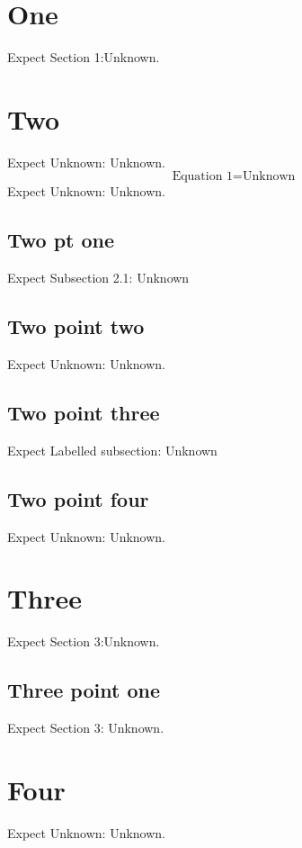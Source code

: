 \documentclass{article}
\def\where{Unknown}
\begin{document}
\section{One}
Expect Section 1:\where.

\section{Two}
Expect Unknown: \where.
\begin{equation}
  \mbox{Equation 1} = \mbox{\where}
\end{equation}
Expect Unknown: \where.

\subsection{Two pt one}
Expect Subsection 2.1: \where

\subsection{Two point two}
Expect Unknown: \where.

\subsection{Two point three}\label{labelled}
Expect Labelled subsection: \where

\subsection{Two point four}
Expect Unknown: \where.

\section{Three}
Expect Section 3:\where.

\subsection{Three point one}
Expect Section 3: \where.

\section{Four}
Expect Unknown: \where.
\end{document}
